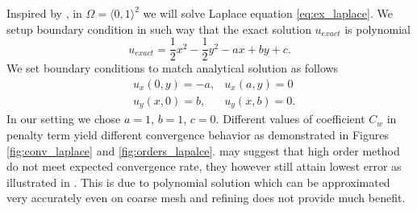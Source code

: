 \begin{example}[Diffusion 2D]
\label{ex:laplace}
Inspired by \cite[cv. 8.4 (3), p. 150]{Holubova2011}, in $\Omega = \langle 0, 1 
\rangle^2$ 
we will solve Laplace equation \eqref{eq:ex_laplace}.
We setup boundary condition in such way that the exact solution 
$u_{exact}$ is polynomial
\begin{equation}
u_{exact} = \frac{1}{2}x^2 - \frac{1}{2}y^2 - ax + by + c.
\end{equation}
We set boundary conditions to match analytical solution as follows
\begin{equation}
	\begin{aligned}
		&u_x(0, y) = -a, & u_x(a, y) = 0\\
		&u_y(x, 0) = b, & u_y(x, b) = 0.
	\end{aligned}
\end{equation}
In our setting we chose $a=1$, $b=1$, $c=0$. Different values of 
coefficient $C_w$ in penalty term yield different convergence behavior as demonstrated in 
Figures \ref{fig:conv_laplace} and \ref{fig:orders_lapalce}.   
may suggest that high order method do not meet expected convergence rate, they however 
still attain lowest error as illustrated in . This is due to 
polynomial solution which can be approximated very accurately even on coarse mesh and 
refining does not provide much benefit.
\end{example}

